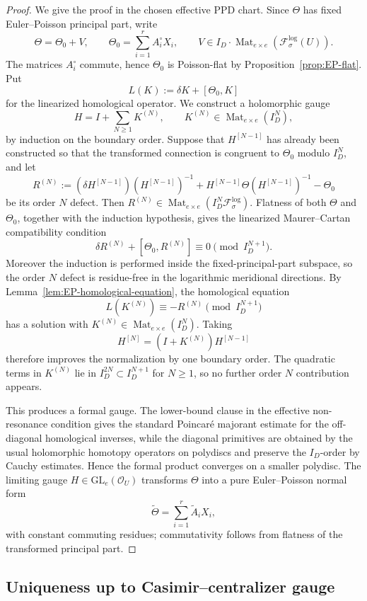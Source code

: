 \documentclass[11pt]{amsart}
\theoremstyle{plain}
\theoremstyle{definition}
\DeclareMathOperator{\Mat}{Mat}
\newcommand{\fol}{\mathcal{F}}
\newcommand{\GL}{\mathrm{GL}}
\theoremstyle{definition}
\newcommand{\OO}{\mathcal{O}}
\begin{document}
\begin{proof}
We give the proof in the chosen effective PPD chart.  Since \(\Theta\) has fixed Euler--Poisson principal part, write
\[
\Theta=\Theta_0+V,
\qquad
\Theta_0=\sum_{i=1}^r A_i^\circ X_i,
\qquad
V\in I_D\cdot\Mat_{e\times e}(\fol_\sigma^{\log}(U)).
\]
The matrices \(A_i^\circ\) commute, hence \(\Theta_0\) is Poisson-flat by Proposition~\ref{prop:EP-flat}.  Put
\[
L(K):=\delta K+[\Theta_0,K]
\]
for the linearized homological operator.
We construct a holomorphic gauge
\[
H=I+\sum_{N\ge1}K^{(N)},
\qquad K^{(N)}\in\Mat_{e\times e}(I_D^N),
\]
by induction on the boundary order.  Suppose that \(H^{[N-1]}\) has already been constructed so that the
transformed connection is congruent to \(\Theta_0\) modulo \(I_D^N\), and let
\[
R^{(N)}:=(\delta H^{[N-1]})(H^{[N-1]})^{-1}
       +H^{[N-1]}\Theta(H^{[N-1]})^{-1}-\Theta_0
\]
be its order \(N\) defect.  Then
\(R^{(N)}\in\Mat_{e\times e}(I_D^N\fol_\sigma^{\log})\).  Flatness of both \(\Theta\) and \(\Theta_0\), together
with the induction hypothesis, gives the linearized Maurer--Cartan compatibility condition
\[
        \delta R^{(N)}+[\Theta_0,R^{(N)}]\equiv0
        \pmod {I_D^{N+1}}.
\]
Moreover the induction is performed inside the fixed-principal-part subspace, so the order \(N\) defect is
residue-free in the logarithmic meridional directions.
By Lemma~\ref{lem:EP-homological-equation}, the homological equation
\[
        L(K^{(N)})\equiv -R^{(N)}\pmod{I_D^{N+1}}
\]
has a solution with \(K^{(N)}\in\Mat_{e\times e}(I_D^N)\).  Taking
\[
H^{[N]}=(I+K^{(N)})H^{[N-1]}
\]
therefore improves the normalization by one boundary order.  The quadratic terms in \(K^{(N)}\) lie in
\(I_D^{2N}\subset I_D^{N+1}\) for \(N\ge1\), so no further order \(N\) contribution appears.

This produces a formal gauge.  The lower-bound clause in the effective non-resonance condition gives the
standard Poincar\'e majorant estimate for the off-diagonal homological inverses, while the diagonal primitives
are obtained by the usual holomorphic homotopy operators on polydiscs and preserve the \(I_D\)-order by
Cauchy estimates.  Hence the formal product converges on a smaller polydisc.  The limiting gauge
\(H\in\GL_e(\OO_U)\) transforms \(\Theta\) into a pure Euler--Poisson normal form
\[
        \widetilde\Theta=\sum_{i=1}^r\widetilde A_iX_i,
\]
with constant commuting residues; commutativity follows from flatness of the transformed principal part.
\end{proof}


\subsection{Uniqueness up to Casimir--centralizer gauge}\label{subsec:uniq-casimir}
\end{document}
